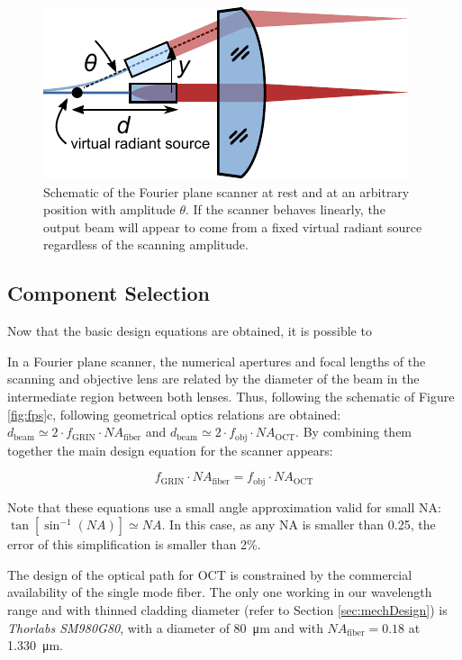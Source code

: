 \begin{figure}[h!]\centering
      \includegraphics{figures/30_DesignSimulation/Mechanical/radiant.pdf}
      \caption{Schematic of the Fourier plane scanner at rest and at an arbitrary position with amplitude $\theta$. If the scanner behaves linearly, the output beam will appear to come from a fixed virtual radiant source regardless of the scanning amplitude.}
      \label{fig:radiant}
\end{figure}

\subsection{Component Selection}
Now that the basic design equations are obtained, it is possible to 

In a Fourier plane scanner, the numerical apertures and focal lengths of the scanning and objective lens are related by the diameter of the beam in the intermediate region between both lenses. Thus, following the schematic of Figure \ref{fig:fps}c, following geometrical optics relations are obtained: $d_\mathrm{beam} \simeq 2\cdot f_\mathrm{GRIN}\cdot \mathit{NA}_\mathrm{fiber}$ and $d_\mathrm{beam} \simeq 2 \cdot f_\mathrm{obj}\cdot \mathit{NA}_\mathrm{OCT}$. By combining them together the main design equation for the scanner appears:

\begin{equation}
f_\mathrm{GRIN} \cdot \mathit{NA}_\mathrm{fiber} = f_\mathrm{obj} \cdot \mathit{NA}_\mathrm{OCT}
\end{equation}

Note that these equations use a small angle approximation valid for small NA: \\ $\tan[	\sin^{-1}(\mathit{NA})] \simeq \mathit{NA} $. In this case, as any NA is smaller than 0.25, the error of this simplification is smaller than 2\%.

The design of the optical path for OCT is constrained by the commercial availability of the single mode fiber. The only one working in our wavelength range and with thinned cladding diameter (refer to Section \ref{sec:mechDesign}) is \textit{Thorlabs SM980G80}, with a diameter of \SI{80}{\micro\meter} and with $\mathit{NA_\mathrm{fiber}} = 0.18$ at \SI{1.330}{\micro\meter}. 

